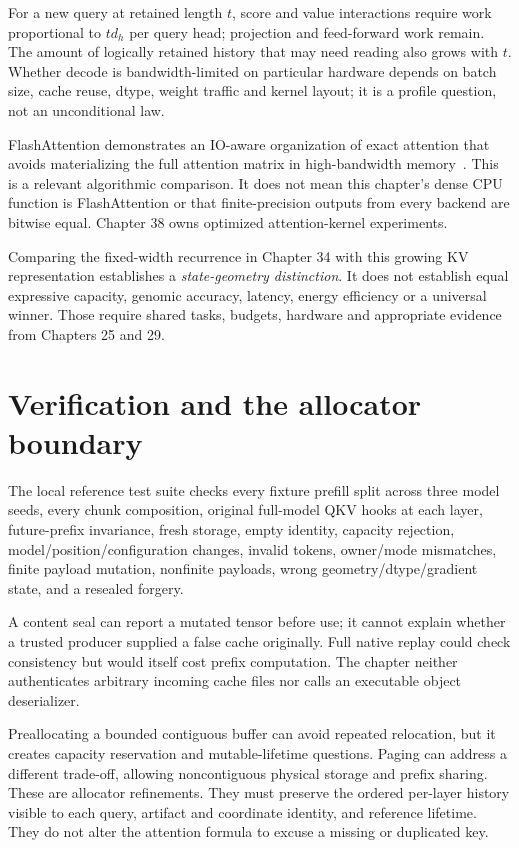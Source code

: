 For a new query at retained length $t$, score and value interactions require
work proportional to $td_h$ per query head; projection and feed-forward
work remain. The amount of logically retained history that may need reading
also grows with $t$. Whether decode is bandwidth-limited on particular hardware
depends on batch size, cache reuse, dtype, weight traffic and kernel layout;
it is a profile question, not an unconditional law.

FlashAttention demonstrates an IO-aware organization of exact attention
that avoids materializing the full attention matrix in high-bandwidth
memory~\cite{flash}. This is a relevant algorithmic comparison. It does not
mean this chapter's dense CPU function is FlashAttention or that finite-precision
outputs from every backend are bitwise equal. Chapter 38 owns optimized
attention-kernel experiments.

Comparing the fixed-width recurrence in Chapter 34 with this growing KV
representation establishes a \emph{state-geometry distinction}. It does not
establish equal expressive capacity, genomic accuracy, latency, energy
efficiency or a universal winner. Those require shared tasks, budgets,
hardware and appropriate evidence from Chapters 25 and 29.

\section{Verification and the allocator boundary}
\label{evod35:verification}
The local reference test suite checks every fixture prefill split across
three model seeds, every chunk composition, original full-model QKV hooks at
each layer, future-prefix invariance, fresh storage, empty identity,
capacity rejection, model/position/configuration changes, invalid tokens,
owner/mode mismatches, finite payload mutation, nonfinite payloads, wrong
geometry/dtype/gradient state, and a resealed forgery.

A content seal can report a mutated tensor before use; it cannot explain
whether a trusted producer supplied a false cache originally. Full native
replay could check consistency but would itself cost prefix computation.
The chapter neither authenticates arbitrary incoming cache files nor calls
an executable object deserializer.


Preallocating a bounded contiguous buffer can avoid repeated relocation,
but it creates capacity reservation and mutable-lifetime questions. Paging
can address a different trade-off, allowing noncontiguous physical storage
and prefix sharing. These are allocator refinements. They must preserve the
ordered per-layer history visible to each query, artifact and coordinate
identity, and reference lifetime. They do not alter the attention formula
to excuse a missing or duplicated key.

